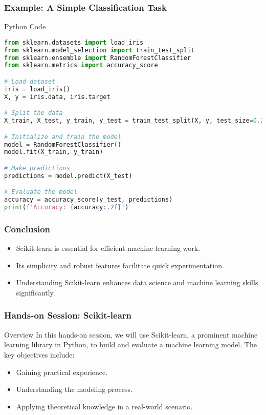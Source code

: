 \documentclass[aspectratio=169]{beamer}
\begin{document}
\begin{frame}[fragile]
    \frametitle{Example: A Simple Classification Task}
    \begin{block}{Python Code}
        \begin{lstlisting}[language=Python]
from sklearn.datasets import load_iris
from sklearn.model_selection import train_test_split
from sklearn.ensemble import RandomForestClassifier
from sklearn.metrics import accuracy_score

# Load dataset
iris = load_iris()
X, y = iris.data, iris.target

# Split the data
X_train, X_test, y_train, y_test = train_test_split(X, y, test_size=0.2, random_state=42)

# Initialize and train the model
model = RandomForestClassifier()
model.fit(X_train, y_train)

# Make predictions
predictions = model.predict(X_test)

# Evaluate the model
accuracy = accuracy_score(y_test, predictions)
print(f'Accuracy: {accuracy:.2f}')
        \end{lstlisting}
    \end{block}
\end{frame}

\begin{frame}
    \frametitle{Conclusion}
    \begin{itemize}
        \item Scikit-learn is essential for efficient machine learning work.
        \item Its simplicity and robust features facilitate quick experimentation.
        \item Understanding Scikit-learn enhances data science and machine learning skills significantly.
    \end{itemize}
\end{frame}

\begin{frame}
    \frametitle{Hands-on Session: Scikit-learn}
    \begin{block}{Overview}
        In this hands-on session, we will use Scikit-learn, a prominent machine learning library in Python, to build and evaluate a machine learning model. The key objectives include:
        \begin{itemize}
            \item Gaining practical experience.
            \item Understanding the modeling process.
            \item Applying theoretical knowledge in a real-world scenario.
        \end{itemize}
    \end{block}
\end{frame}
\end{document}
